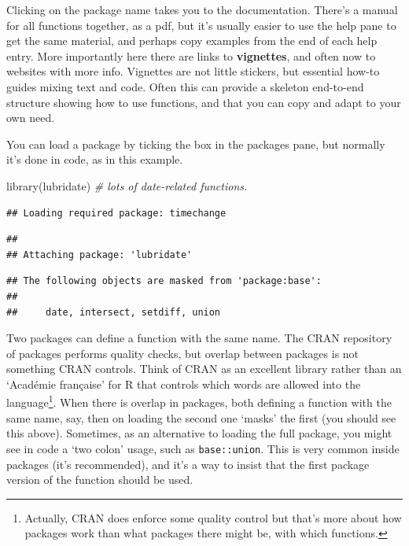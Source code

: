 \documentclass[
]{book}
\newenvironment{Shaded}{\begin{snugshade}}{\end{snugshade}}
\newcommand{\CommentTok}[1]{\textcolor[rgb]{0.56,0.35,0.01}{\textit{#1}}}
\newcommand{\FunctionTok}[1]{\textcolor[rgb]{0.00,0.00,0.00}{#1}}
\newcommand{\NormalTok}[1]{#1}
\begin{document}
Clicking on the package name takes you to the documentation. There's a manual for all functions together, as a pdf, but it's usually easier to use the help pane to get the same material, and perhaps copy examples from the end of each help entry. More importantly here there are links to \textbf{vignettes}, and often now to websites with more info. Vignettes are not little stickers, but essential how-to guides mixing text and code. Often this can provide a skeleton end-to-end structure showing how to use functions, and that you can copy and adapt to your own need.

You can load a package by ticking the box in the packages pane, but normally it's done in code, as in this example.

\begin{Shaded}
\begin{Highlighting}[]
\FunctionTok{library}\NormalTok{(lubridate) }\CommentTok{\# lots of date{-}related functions.}
\end{Highlighting}
\end{Shaded}

\begin{verbatim}
## Loading required package: timechange
\end{verbatim}

\begin{verbatim}
## 
## Attaching package: 'lubridate'
\end{verbatim}

\begin{verbatim}
## The following objects are masked from 'package:base':
## 
##     date, intersect, setdiff, union
\end{verbatim}

Two packages can define a function with the same name. The CRAN repository of packages performs quality checks, but overlap between packages is not something CRAN controls. Think of CRAN as an excellent library rather than an `Académie française' for R that controls which words are allowed into the language\footnote{Actually, CRAN does enforce some quality control but that's more about how packages work than what packages there might be, with which functions.}. When there is overlap in packages, both defining a function with the same name, say, then on loading the second one `masks' the first (you should see this above). Sometimes, as an alternative to loading the full package, you might see in code a `two colon' usage, such as \texttt{base::union}. This is very common inside packages (it's recommended), and it's a way to insist that the first package version of the function should be used.
\end{document}
